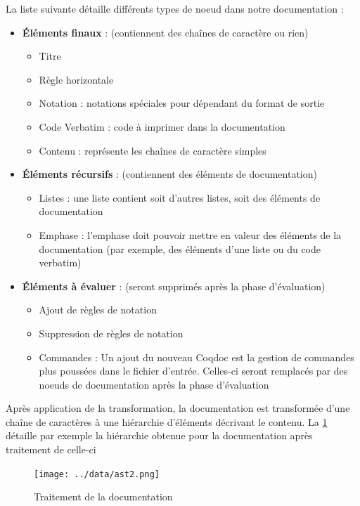 \documentclass[a4paper, 11pt]{report}
\begin{document}
    La liste suivante détaille différents types de noeud dans notre
    documentation :
    \begin{itemize}
      \item \textbf{Éléments finaux} : (contiennent des chaînes de caractère ou rien)
        \begin{itemize}
            \item Titre
            \item Règle horizontale
            \item Notation : notations spéciales pour dépendant du format de sortie
            \item Code Verbatim : code à imprimer dans la documentation
            \item Contenu : représente les chaînes de caractère simples
        \end{itemize}
      \item \textbf{Éléments récursifs} : (contiennent des éléments de documentation)
        \begin{itemize}
          \item Listes : une liste contient soit d'autres listes, soit des
                éléments de documentation
          \item Emphase : l'emphase doit pouvoir mettre en valeur des éléments
                de la documentation (par exemple, des éléments d'une liste ou
                du code verbatim)
        \end{itemize}
      \item \textbf{Éléments à évaluer} : (seront supprimés après la phase d'évaluation)
        \begin{itemize}
          \item Ajout de règles de notation
          \item Suppression de règles de notation
          \item Commandes : Un ajout du nouveau Coqdoc est la gestion de
                commandes plus poussées dans le fichier d'entrée. Celles-ci
                seront remplacés par des noeuds de documentation après la
                phase d'évaluation
        \end{itemize}
    \end{itemize}
    Après application de la transformation, la documentation est transformée
    d'une chaîne de caractères à une hiérarchie d'éléments décrivant le contenu.
    La \cref{ast2} détaille par exemple la hiérarchie obtenue pour la
   documentation après traitement de celle-ci
    \begin{figure}
      \texttt{[image: ../data/ast2.png]}
      \caption{Traitement de la documentation}
      \label{ast2}
    \end{figure}
\end{document}
